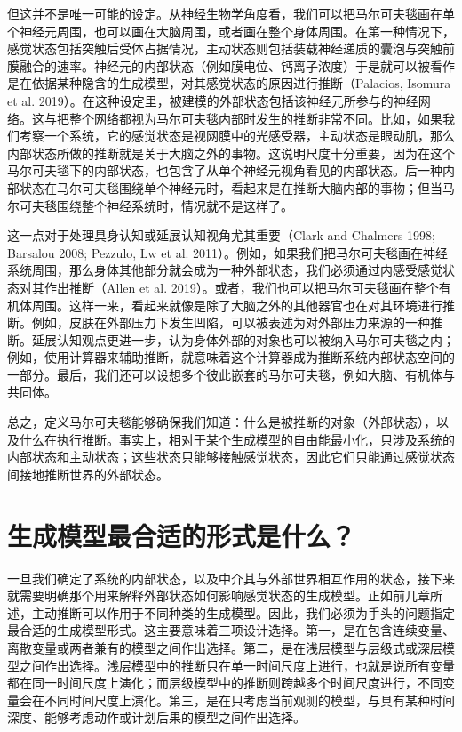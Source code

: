 但这并不是唯一可能的设定。从神经生物学角度看，我们可以把马尔可夫毯画在单个神经元周围，也可以画在大脑周围，或者画在整个身体周围。在第一种情况下，感觉状态包括突触后受体占据情况，主动状态则包括装载神经递质的囊泡与突触前膜融合的速率。神经元的内部状态（例如膜电位、钙离子浓度）于是就可以被看作是在依据某种隐含的生成模型，对其感觉状态的原因进行推断（Palacios, Isomura et al. 2019）。在这种设定里，被建模的外部状态包括该神经元所参与的神经网络。这与把整个网络都视为马尔可夫毯内部时发生的推断非常不同。比如，如果我们考察一个系统，它的感觉状态是视网膜中的光感受器，主动状态是眼动肌，那么内部状态所做的推断就是关于大脑之外的事物。这说明尺度十分重要，因为在这个马尔可夫毯下的内部状态，也包含了从单个神经元视角看见的内部状态。后一种内部状态在马尔可夫毯围绕单个神经元时，看起来是在推断大脑内部的事物；但当马尔可夫毯围绕整个神经系统时，情况就不是这样了。

这一点对于处理具身认知或延展认知视角尤其重要（Clark and Chalmers 1998; Barsalou 2008; Pezzulo, Lw et al. 2011）。例如，如果我们把马尔可夫毯画在神经系统周围，那么身体其他部分就会成为一种外部状态，我们必须通过内感受感觉状态对其作出推断（Allen et al. 2019）。或者，我们也可以把马尔可夫毯画在整个有机体周围。这样一来，看起来就像是除了大脑之外的其他器官也在对其环境进行推断。例如，皮肤在外部压力下发生凹陷，可以被表述为对外部压力来源的一种推断。延展认知观点更进一步，认为身体外部的对象也可以被纳入马尔可夫毯之内；例如，使用计算器来辅助推断，就意味着这个计算器成为推断系统内部状态空间的一部分。最后，我们还可以设想多个彼此嵌套的马尔可夫毯，例如大脑、有机体与共同体。

总之，定义马尔可夫毯能够确保我们知道：什么是被推断的对象（外部状态），以及什么在执行推断。事实上，相对于某个生成模型的自由能最小化，只涉及系统的内部状态和主动状态；这些状态只能够接触感觉状态，因此它们只能通过感觉状态间接地推断世界的外部状态。

\section{生成模型最合适的形式是什么？}

一旦我们确定了系统的内部状态，以及中介其与外部世界相互作用的状态，接下来就需要明确那个用来解释外部状态如何影响感觉状态的生成模型。正如前几章所述，主动推断可以作用于不同种类的生成模型。因此，我们必须为手头的问题指定最合适的生成模型形式。这主要意味着三项设计选择。第一，是在包含连续变量、离散变量或两者兼有的模型之间作出选择。第二，是在浅层模型与层级式或深层模型之间作出选择。浅层模型中的推断只在单一时间尺度上进行，也就是说所有变量都在同一时间尺度上演化；而层级模型中的推断则跨越多个时间尺度进行，不同变量会在不同时间尺度上演化。第三，是在只考虑当前观测的模型，与具有某种时间深度、能够考虑动作或计划后果的模型之间作出选择。

